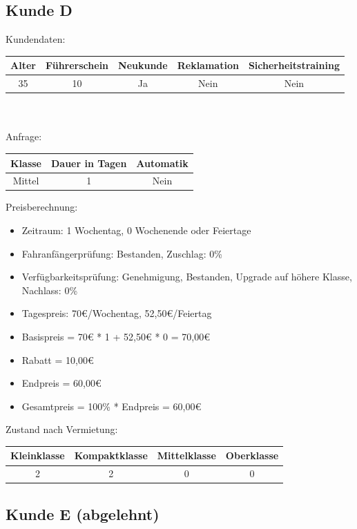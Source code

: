 \subsection{Kunde D}

Kundendaten:\\
\begin{tabular}{|c|c|c|c|c|}
	\hline \textbf{Alter} & \textbf{Führerschein} & \textbf{Neukunde} & \textbf{Reklamation} & \textbf{Sicherheitstraining} \\ 
	\hline 35 & 10 & Ja & Nein & Nein \\ 
	\hline 
\end{tabular} 
\\\\
Anfrage:\\
\begin{tabular}{|c|c|c|}
	\hline \textbf{Klasse} & \textbf{Dauer in Tagen} & \textbf{Automatik} \\ 
	\hline Mittel & 1 & Nein \\ 
	\hline 
\end{tabular}

Preisberechnung:
\begin{itemize}
	\item Zeitraum: 1 Wochentag, 0 Wochenende oder Feiertage
	\item Fahranfängerprüfung: Bestanden, Zuschlag: 0\%
	\item Verfügbarkeitsprüfung: Genehmigung, Bestanden, Upgrade auf höhere Klasse, Nachlass: 0\%
	\item Tagespreis: 70€/Wochentag, 52,50€/Feiertag
	\item Basispreis = 70€ * 1 + 52,50€ * 0 = 70,00€
	\item Rabatt = 10,00€
	\item Endpreis = 60,00€
	\item Gesamtpreis = 100\% * Endpreis = 60,00€
\end{itemize}

Zustand nach Vermietung:\\
\begin{tabular}{|c|c|c|c|}
	\hline \textbf{Kleinklasse} & \textbf{Kompaktklasse} & \textbf{Mittelklasse} & \textbf{Oberklasse}  \\ 
	\hline 2 & 2 & 0 & 0 \\ 
	\hline 
\end{tabular}

\subsection{Kunde E (abgelehnt)}

